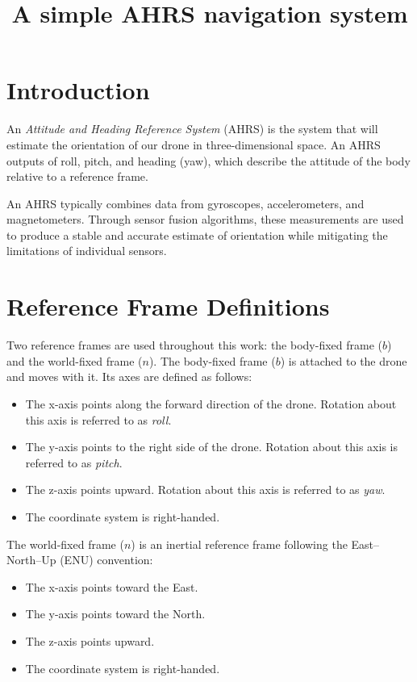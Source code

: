 \documentclass{article}
\title{A simple AHRS navigation system}
\author{}
\date{}
\begin{document}
	
	\maketitle
	
	
\section{Introduction}

	An \textit{Attitude and Heading Reference System} (AHRS) is the system that will estimate the orientation of our drone in three-dimensional space. An AHRS outputs of roll, pitch, and heading (yaw), which describe the attitude of the body relative to a reference frame.
	
	\vspace{1em}
	
	\noindent An AHRS typically combines data from gyroscopes, accelerometers, and magnetometers. Through sensor fusion algorithms, these measurements are used to produce a stable and accurate estimate of orientation while mitigating the limitations of individual sensors.
	
\section{Reference Frame Definitions}

Two reference frames are used throughout this work: the body-fixed frame ($b$) and the world-fixed frame ($n$).
The body-fixed frame ($b$) is attached to the drone and moves with it. Its axes are defined as follows:

\begin{itemize}
	\item The x-axis points along the forward direction of the drone. Rotation about this axis is referred to as \emph{roll}.
	\item The y-axis points to the right side of the drone. Rotation about this axis is referred to as \emph{pitch}.
	\item The z-axis points upward. Rotation about this axis is referred to as \emph{yaw}.
	\item The coordinate system is right-handed.
\end{itemize}

\noindent The world-fixed frame ($n$) is an inertial reference frame following the East--North--Up (ENU) convention:

\begin{itemize}
	\item The x-axis points toward the East.
	\item The y-axis points toward the North.
	\item The z-axis points upward.
	\item The coordinate system is right-handed.
\end{itemize}
\end{document}
